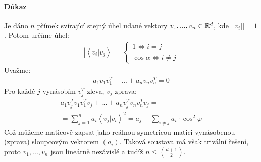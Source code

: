 \documentclass[a4paper,10pt]{article}
\begin{document}
\paragraph{Důkaz}
Je dáno $n$ přímek svírající stejný úhel udané vektory $v_1, ..., v_n\in \mathbb{R}^d$, kde
$||v_i||= 1$. Potom určíme úhel:
\begin{align}
	\left|\left< v_i | v_j \right>\right| = \begin{cases}
		1 \Leftrightarrow i = j \\
		\cos \alpha \Leftrightarrow i \neq j
	\end{cases}
\end{align}
Uvažme:
\begin{align}
	a_1 v_1 v_1^T + ... + a_n v_n v_n^T = 0
\end{align}
Pro každé $j$ vynásobím $v_j^T$ zleva, $v_j$ zprava:
\begin{align}
	a_1 v_j^T v_1 v_1^T v_j + ... + a_n v_j^T v_n v_n^T v_j = \\
	= \sum_{j=1}^n a_i \left< v_j | v_i \right>^2 = a_j + \sum_{i\neq j} a_i
	\cdot
	\cos^2 \varphi
\end{align}
Což můžeme maticově zapsat jako reálnou symetricou matici vynásobenou (zprava)
sloupcovým vektorem $(a_i)$. Taková soustava má však trivální řešení, proto
$v_1, ..., v_n$ jsou lineárně nezávislé a tudíž $n \le \binom{d+1}{2}$.
\end{document}

